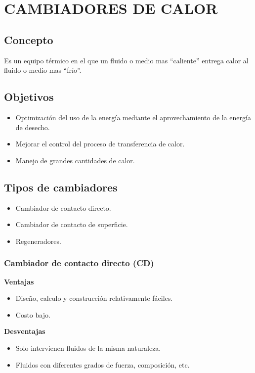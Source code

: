\chapter{CAMBIADORES DE CALOR}

\section{Concepto}
Es un equipo térmico en el que un fluido o medio mas ``caliente'' entrega calor
al fluido o medio mas ``frío''.

\section{Objetivos}
\begin{itemize}
    \item Optimización del uso de la energía mediante el aprovechamiento de la
        energía de desecho.
    \item Mejorar el control del proceso de transferencia de calor.
    \item Manejo de grandes cantidades de calor.
\end{itemize}

\section{Tipos de cambiadores}
\begin{itemize}
    \item Cambiador de contacto directo.
    \item Cambiador de contacto de superficie.
    \item Regeneradores.
\end{itemize}

\subsection{Cambiador de contacto directo (CD)}


\textbf{Ventajas}
\begin{itemize}
    \item Diseño, calculo y construcción relativamente fáciles.
    \item Costo bajo.
\end{itemize}

\textbf{Desventajas}
\begin{itemize}
    \item Solo intervienen fluidos de la misma naturaleza.
    \item Fluidos con diferentes grados de fuerza, composición, etc.
\end{itemize}

